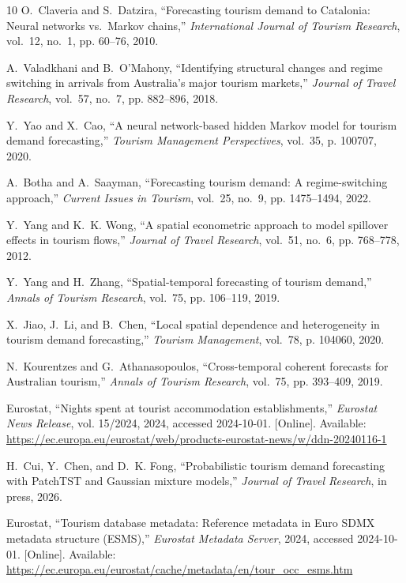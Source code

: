 \documentclass[10pt,journal,compsoc]{IEEEtran}
\begin{document}
\begin{thebibliography}{10}
O.~Claveria and S.~Datzira, ``Forecasting tourism demand to {Catalonia}:
  Neural networks vs.\ {Markov} chains,'' \emph{International Journal of
  Tourism Research}, vol.~12, no.~1, pp. 60--76, 2010.

A.~Valadkhani and B.~O'Mahony, ``Identifying structural changes and regime
  switching in arrivals from {Australia's} major tourism markets,''
  \emph{Journal of Travel Research}, vol.~57, no.~7, pp. 882--896, 2018.

Y.~Yao and X.~Cao, ``A neural network-based hidden {Markov} model for tourism
  demand forecasting,'' \emph{Tourism Management Perspectives}, vol.~35, p.
  100707, 2020.

A.~Botha and A.~Saayman, ``Forecasting tourism demand: A regime-switching
  approach,'' \emph{Current Issues in Tourism}, vol.~25, no.~9, pp. 1475--1494,
  2022.

Y.~Yang and K.~K. Wong, ``A spatial econometric approach to model spillover
  effects in tourism flows,'' \emph{Journal of Travel Research}, vol.~51,
  no.~6, pp. 768--778, 2012.

Y.~Yang and H.~Zhang, ``Spatial-temporal forecasting of tourism demand,''
  \emph{Annals of Tourism Research}, vol.~75, pp. 106--119, 2019.

X.~Jiao, J.~Li, and B.~Chen, ``Local spatial dependence and heterogeneity in
  tourism demand forecasting,'' \emph{Tourism Management}, vol.~78, p. 104060,
  2020.

N.~Kourentzes and G.~Athanasopoulos, ``Cross-temporal coherent forecasts for
  {Australian} tourism,'' \emph{Annals of Tourism Research}, vol.~75, pp.
  393--409, 2019.

{Eurostat}, ``Nights spent at tourist accommodation establishments,''
  \emph{Eurostat News Release}, vol. 15/2024, 2024, accessed 2024-10-01.
  [Online]. Available: \url{https://ec.europa.eu/eurostat/web/products-eurostat-news/w/ddn-20240116-1}

H.~Cui, Y.~Chen, and D.~K. Fong, ``Probabilistic tourism demand forecasting
  with {PatchTST} and {Gaussian} mixture models,'' \emph{Journal of Travel
  Research}, in press, 2026.

{Eurostat}, ``Tourism database metadata: Reference metadata in {Euro} {SDMX}
  metadata structure ({ESMS}),'' \emph{Eurostat Metadata Server}, 2024,
  accessed 2024-10-01. [Online]. Available:
  \url{https://ec.europa.eu/eurostat/cache/metadata/en/tour_occ_esms.htm}


\end{thebibliography}
\end{document}
